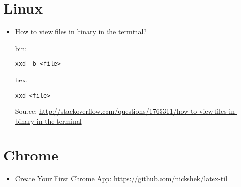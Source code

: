 \documentclass{article}
\begin{document}
\section{Linux}

\begin{itemize}
\item How to view files in binary in the terminal?

bin:
\begin{lstlisting}
xxd -b <file>
\end{lstlisting}

hex:
\begin{lstlisting}
xxd <file>
\end{lstlisting}

Source: \href{http://stackoverflow.com/questions/1765311/how-to-view-files-in-binary-in-the-terminal}{http://stackoverflow.com/questions/1765311/how-to-view-files-in-binary-in-the-terminal}

\end{itemize}

\section{Chrome}

\begin{itemize}
\item Create Your First Chrome App: \href{https://github.com/nickshek/latex-til}{https://github.com/nickshek/latex-til}
\end{itemize}
\end{document}
